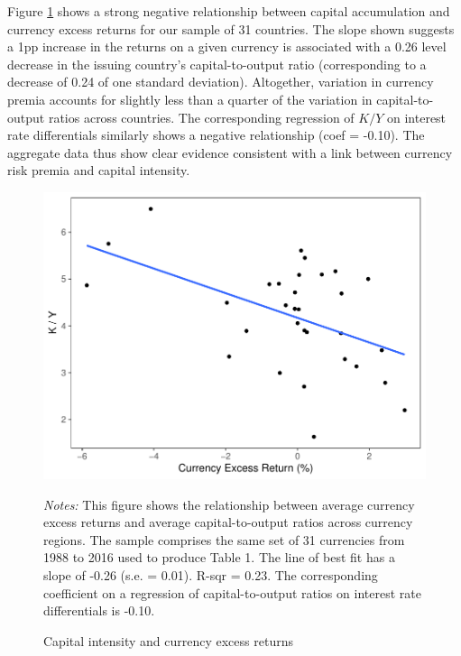 \documentclass{ar-1col}
\begin{document}

Figure \ref{fig:ky_rx} shows a strong negative relationship between capital accumulation and currency excess returns for our sample of 31 countries. The slope shown suggests a 1pp increase in the returns on a given currency is associated with a 0.26 level decrease in the issuing country's capital-to-output ratio (corresponding to a decrease of 0.24 of one standard deviation). Altogether, variation in currency premia accounts for slightly less than a quarter of the variation in capital-to-output ratios across countries. The corresponding regression of $K/Y$ on interest rate differentials similarly shows a negative relationship (coef = -0.10). The aggregate data thus show clear evidence consistent with a link between currency risk premia and capital intensity. 
\begin{figure}[htp]
    \centering
    \caption{Capital intensity and currency excess returns}
    \label{fig:ky_rx}
    \includegraphics[width=0.7\linewidth]{Exhibits/Figure_KY_RX.pdf}
    \begin{minipage}[htp]{\textwidth}
    \scriptsize 
    \emph{Notes:} This figure shows the relationship between average currency excess returns and average capital-to-output ratios across currency regions. The sample comprises the same set of 31 currencies from 1988 to 2016 used to produce Table 1. The line of best fit has a slope of -0.26 (s.e. = 0.01). R-sqr = 0.23. The corresponding coefficient on a regression of capital-to-output ratios on interest rate differentials is -0.10.
    \end{minipage}
\end{figure}
\end{document}
